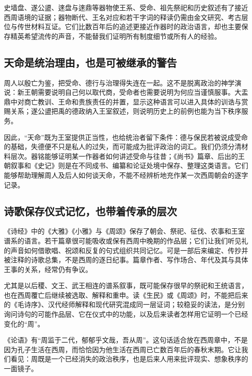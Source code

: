 \begin{sourcenote}[金文的近处与盲区]
史墙盘、遂公盨、逨盘与逨鼎等器物使王系、受命、祖先祭祀和历史叙述有了接近西周语境的证据；器物断代、王名对应和若干字词的释读仍需由金文研究、考古层位与传世材料互证。它们比数百年后的追述更接近作器时的政治语言，却也主要保存精英希望流传的声音，不能替我们证明所有制度细节或所有人的经验。
\end{sourcenote}

\subsection{天命是统治理由，也是可被继承的警告}

周人以殷亡为鉴，把受命、德行与治理得失连在一起。这不是脱离政治的神学演说：新王朝需要说明自己何以取代商，受命者也需要说明为何应当谨慎服事。大盂鼎中对商亡教训、王命和贵族责任的并置，显示这种语言可以进入具体的训诰与赏赐关系；遂公盨把禹的德政纳入王室叙述，则说明历史上的前例也能为当下秩序服务。

因此，“天命”既为王室提供正当性，也给统治者留下条件：德与保民若被说成受命的基础，失德便不只是私人的过失，而可能成为批评政治的词汇。我们仍须分清材料层次。器铭能够证明某一作器者如何讲述受命与往昔；《尚书》篇章、后出的王朝叙事和《史记》则是在不同成书、编纂和论证处境中保存、整理这类语言。它们能够帮助理解周人及后人如何谈天命，不能不经辨析地充作某一次西周朝会的逐字记录。

\subsection{诗歌保存仪式记忆，也带着传承的层次}

《诗经》中的《大雅》《小雅》与《周颂》保存了朝会、祭祀、征伐、农事和王室谱系的语言。若干篇章很可能吸收或保有西周中晚期的作品层；它们让我们听见礼的声音如何借歌唱、祝颂和反复的句式组织共同记忆。可是一部后来编定、传抄并被注释的诗歌总集，不是西周的逐日纪事。篇章作者、写作场合、年代及其与具体王事的关系，经常仍有争议。

尤其是以后稷、文王、武王相连的谱系叙事，既可能保存很早的祭祀和王统语言，也在西周覆亡后继续被选取、解释和重申。读《生民》或《周颂》时，不能把后来的《毛诗序》、汉代经师解释和现代研究混成同一层证词；较稳妥的读法，是分别询问诗句的可能作品层、它在仪式中的功能，以及后来读者怎样用它证明一个已经变化的“周”。

\begin{textwindow}[后来的孔子怎样回望周]
《论语》有“周监于二代，郁郁乎文哉，吾从周”。这句话适合放在西周章中，不是因为孔子生活在西周，而恰恰因为他生活在西周已亡数百年后的春秋末期。它让我们看见：周既是一个已经消失的政治秩序，也是后来人用来批评现实、想象秩序的一面镜子。
\end{textwindow}

